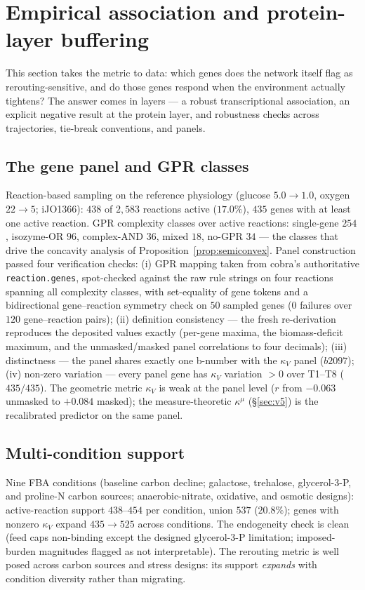 \documentclass[11pt,a4paper]{article}
\theoremstyle{plain}
\theoremstyle{definition}
\theoremstyle{remark}
\newcommand{\kk}{\kappa_{\!V}}
\newcommand{\kmu}{\kappa^{\mu}}
\begin{document}
\section{Empirical association and protein-layer buffering}
\label{sec:empirical}

This section takes the metric to data: which genes does the network
itself flag as rerouting-sensitive, and do those genes respond when
the environment actually tightens? The answer comes in layers --- a
robust transcriptional association, an explicit negative result at
the protein layer, and robustness checks across trajectories,
tie-break conventions, and panels.


\subsection{The gene panel and GPR classes}
\label{sec:e22}
Reaction-based sampling on the reference physiology (glucose $5.0 \to 1.0$, oxygen $22 \to 5$; iJO1366): $438$ of
$2{,}583$ reactions active ($17.0\%$), $435$ genes with at least one
active reaction. GPR complexity classes over active reactions:
single-gene $254$, isozyme-OR $96$, complex-AND $36$, mixed $18$,
no-GPR $34$ --- the classes that drive the concavity analysis of
Proposition~\ref{prop:semiconvex}. Panel construction passed four
verification checks: (i) GPR mapping taken from cobra's authoritative
\texttt{reaction.genes}, spot-checked against the raw rule strings on
four reactions spanning all complexity classes, with set-equality of
gene tokens and a bidirectional gene--reaction symmetry check on $50$
sampled genes ($0$ failures over $120$ gene--reaction pairs); (ii)
definition consistency --- the fresh re-derivation reproduces the
deposited values exactly (per-gene maxima, the biomass-deficit
maximum, and the unmasked/masked panel correlations to four
decimals); (iii) distinctness --- the panel shares exactly one b-number with the $\kk$ panel ($b2097$); (iv) non-zero variation ---
every panel gene has $\kappa_V$ variation $> 0$ over T1--T8
($435/435$). The geometric metric $\kk$ is weak at the panel
level ($r$ from $-0.063$ unmasked to $+0.084$ masked); the
measure-theoretic $\kmu$ (\S\ref{sec:v5}) is the recalibrated
predictor on the same panel.

\subsection{Multi-condition support}
\label{sec:e23}
Nine FBA conditions (baseline carbon decline; galactose, trehalose,
glycerol-3-P, and proline-N carbon sources; anaerobic-nitrate,
oxidative, and osmotic designs): active-reaction support $438$--$454$
per condition, union $537$ ($20.8\%$); genes with nonzero $\kk$
expand $435 \to 525$ across conditions. The endogeneity check is clean (feed caps non-binding except the designed glycerol-3-P
limitation; imposed-burden magnitudes flagged as not interpretable).
The rerouting metric is well posed across carbon sources and stress
designs: its support \emph{expands} with condition diversity rather
than migrating.
\end{document}
